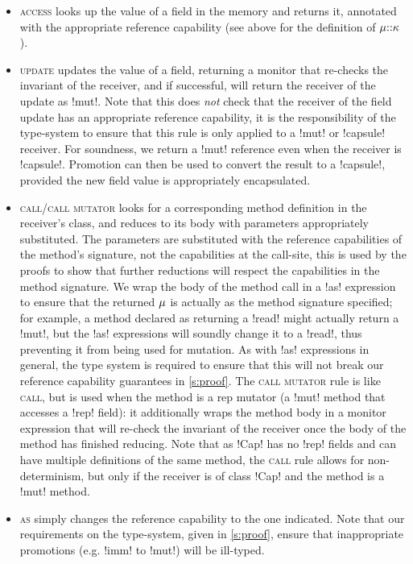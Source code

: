 \begin{itemize}
\item \textsc{access} looks up the value of a field in the memory and returns it, annotated with the appropriate reference capability (see above for the definition of $\mu{::}\kappa$).
\item \textsc{update} updates the value of a field, returning a monitor that re-checks the invariant of the receiver, and if successful, will return the receiver of the update as \Q!mut!. Note that this does \emph{not} check that the receiver of the field update has an appropriate reference capability, it is the responsibility of the type-system to ensure that this rule is only applied to a \Q!mut! or \Q!capsule! receiver. For soundness, we return a \Q!mut! reference even when the receiver is \Q!capsule!. Promotion can then be used to convert the result to a \Q!capsule!, provided the new field value is appropriately encapsulated.
\item \textsc{call/call mutator} looks for a corresponding method definition in the receiver's class, and reduces to its body with parameters appropriately substituted. The parameters are substituted with the reference capabilities of the method's signature, not the capabilities at the call-site, this is used by the proofs to show that further reductions will respect the capabilities in the method signature. We wrap the body of the method call in a \Q!as! expression to ensure that the returned $\mu$ is actually as the method signature specified; for example, a method declared as returning a \Q!read! might actually return a \Q!mut!, but the \Q!as! expressions will soundly change it to a \Q!read!, thus preventing it from being used for mutation. As with \Q!as! expressions in general, the type system is required to ensure that this will not break our reference capability guarantees in \ref{s:proof}.
The \textsc{call mutator} rule is like \textsc{call}, but is used when the method is a rep mutator (a \Q!mut! method that accesses a \Q!rep! field):
it additionally wraps the method body in a monitor expression that will re-check the invariant of the receiver once the body of the method has finished reducing.
Note that as \Q!Cap! has no \Q!rep! fields and can have multiple definitions of the same method, the \textsc{call} rule allows for non-determinism, but only if the receiver is of class \Q!Cap! and the method is a \Q!mut! method.

\item \textsc{as} simply changes the reference capability to the one indicated. Note that our requirements on the type-system, given in \ref{s:proof}, ensure that inappropriate promotions (e.g. \Q!imm! to \Q!mut!) will be ill-typed.


\end{itemize}
